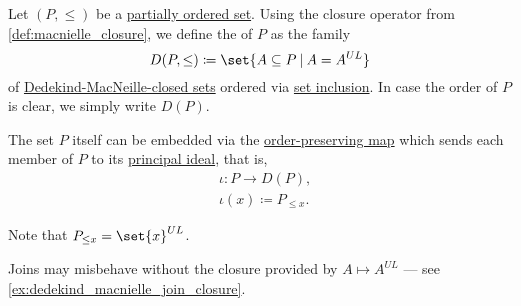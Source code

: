 \begin{definition}\label{def:dedekind_macnielle_completion}
  Let \( (P, \leq) \) be a \hyperref[def:partially_ordered_set]{partially ordered set}. Using the closure operator from \cref{def:macnielle_closure}, we define the  of \( P \) as the family
  \begin{equation*}
    D(P, \leq) \coloneqq \set{ A \subseteq P \given A = A^{UL} }
  \end{equation*}
  of \hyperref[def:macnielle_closure]{Dedekind-MacNeille-closed sets} ordered via \hyperref[def:subset]{set inclusion}. In case the order of \( P \) is clear, we simply write \( D(P) \).

  The set \( P \) itself can be embedded via the \hyperref[def:order_function/preserving]{order-preserving map} which sends each member of \( P \) to its \hyperref[def:lattice_ideal/principal]{principal ideal}, that is,
  \begin{equation*}
    \begin{aligned}
      &\iota: P \to D(P), \\
      &\iota(x) \coloneqq P_{\leq x}.
    \end{aligned}
  \end{equation*}
\end{definition}
\begin{comments}
  \item Note that \( P_{\leq x} = \set{ x }^{UL} \).
  \item Joins may misbehave without the closure provided by \( A \mapsto A^{UL} \) --- see \cref{ex:dedekind_macnielle_join_closure}.
\end{comments}

